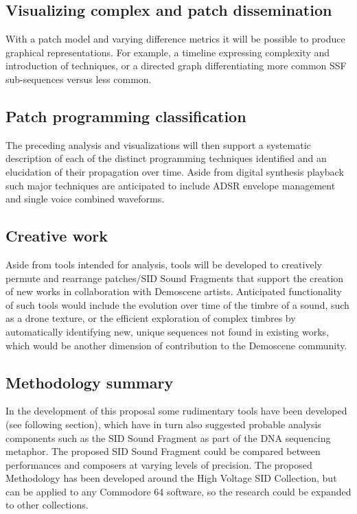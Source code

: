 \documentclass[10pt]{article}
\begin{document}
\begin{multicols*}{2}
\subsection{Visualizing complex and patch dissemination}

With a patch model and varying difference metrics it will be possible to produce graphical representations. For example, a timeline expressing complexity and introduction of techniques, or a directed graph differentiating more common SSF sub-sequences versus less common.

\subsection{Patch programming classification}

The preceding analysis and visualizations will then support a systematic description of each of the distinct programming techniques identified and an elucidation of their propagation over time. Aside from digital synthesis playback such major techniques are anticipated to include ADSR envelope management and single voice combined waveforms.

\subsection{Creative work}

Aside from tools intended for analysis, tools will be developed to creatively permute and rearrange patches/SID Sound Fragments that support the creation of new works in collaboration with Demoscene artists. Anticipated functionality of such tools would include the evolution over time of the timbre of a sound, such as a drone texture, or the efficient exploration of complex timbres by automatically identifying new, unique sequences not found in existing works, which would be another dimension of contribution to the Demoscene community.

\subsection{Methodology summary}

In the development of this proposal some rudimentary tools have been developed (see following section), which have in turn also suggested probable analysis components such as the SID Sound Fragment as part of the DNA sequencing metaphor. The proposed SID Sound Fragment could be compared between performances and composers at varying levels of precision. The proposed Methodology has been developed around the High Voltage SID Collection, but can be applied to any Commodore 64 software, so the research could be expanded to other collections.


\end{multicols*}
\end{document}
